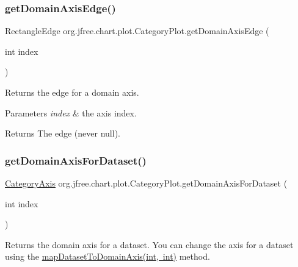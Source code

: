 \subsubsection{\texorpdfstring{get\+Domain\+Axis\+Edge()}{getDomainAxisEdge()}\hspace{0.1cm}{\footnotesize\ttfamily [2/2]}}
{\footnotesize\ttfamily Rectangle\+Edge org.\+jfree.\+chart.\+plot.\+Category\+Plot.\+get\+Domain\+Axis\+Edge (\begin{DoxyParamCaption}\item[{int}]{index }\end{DoxyParamCaption})}

Returns the edge for a domain axis.


\begin{DoxyParams}{Parameters}
{\em index} & the axis index.\\
\hline
\end{DoxyParams}
\begin{DoxyReturn}{Returns}
The edge (never {\ttfamily null}). 
\end{DoxyReturn}
\mbox{\label{classorg_1_1jfree_1_1chart_1_1plot_1_1_category_plot_a4867d8ae8d451d59732abf6bcfce58ee}} 
\subsubsection{\texorpdfstring{get\+Domain\+Axis\+For\+Dataset()}{getDomainAxisForDataset()}}
{\footnotesize\ttfamily \mbox{\hyperlink{classorg_1_1jfree_1_1chart_1_1axis_1_1_category_axis}{Category\+Axis}} org.\+jfree.\+chart.\+plot.\+Category\+Plot.\+get\+Domain\+Axis\+For\+Dataset (\begin{DoxyParamCaption}\item[{int}]{index }\end{DoxyParamCaption})}

Returns the domain axis for a dataset. You can change the axis for a dataset using the \mbox{\hyperlink{classorg_1_1jfree_1_1chart_1_1plot_1_1_category_plot_acd6ce8e64e718ebc15642ca578012c26}{map\+Dataset\+To\+Domain\+Axis(int, int)}} method.



